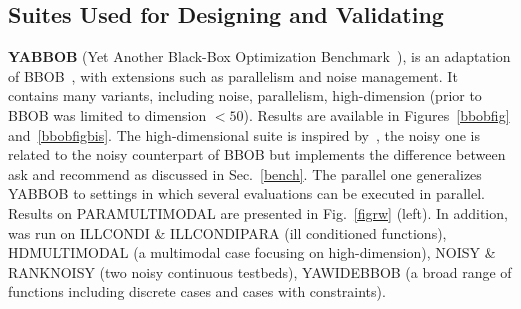 \subsection{Suites Used for Designing and Validating \ngoptq{}}
\label{yabbob}\label{b1}
{\textbf{YABBOB}} (Yet Another Black-Box Optimization Benchmark~\cite{gecco2019}), is an adaptation of BBOB~\cite{bbob}, with extensions such as parallelism and noise management.
It contains many variants, including noise, parallelism, high-dimension (prior to~\cite{bbob-large-ASOC} BBOB was limited to dimension $<50$). 
Results are available in Figures~\ref{bbobfig} and~\ref{bbobfigbis}. The high-dimensional suite is inspired by~\cite{lsgo}, the noisy one is related to the noisy counterpart of BBOB but implements the difference between ask and recommend as discussed in Sec.~\ref{bench}. The parallel one generalizes YABBOB to {settings in which several evaluations can be executed in parallel.} %
Results on PARAMULTIMODAL are presented in  Fig.~\ref{figrw} (left).
{In addition, \ngoptq{} was run on ILLCONDI \& ILLCONDIPARA (ill conditioned functions), HDMULTIMODAL (a multimodal case focusing on high-dimension), NOISY \& RANKNOISY (two noisy continuous testbeds), YAWIDEBBOB (a broad range of functions including discrete cases and cases with constraints). } 
